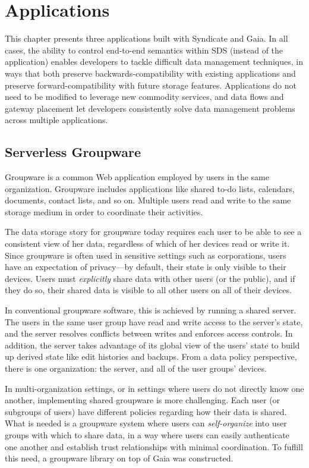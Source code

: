 \chapter{Applications}
\label{chap:applications}

This chapter presents three applications built with Syndicate and Gaia.
In all cases, the ability to control end-to-end semantics within SDS
(instead of the application) enables
developers to tackle difficult data management
techniques, in ways that both preserve backwards-compatibility with existing
applications and preserve forward-compatibility with future storage features.
Applications do not need to be modified to leverage
new commodity services, and data flows and gateway placement let developers
consistently solve data management problems across multiple applications.

\section{Serverless Groupware}

Groupware is a common Web application employed by users in the same
organization.  Groupware includes applications like shared to-do lists, calendars,
documents, contact lists, and so on.  Multiple users read and write to the same
storage medium in order to coordinate their activities.

The data storage story for groupware today requires each user to be able to see
a consistent view of her data, regardless of which of her devices read or write
it.  Since groupware is often used in sensitive
settings such as corporations, users have an expectation of privacy---by
default, their state is only visible to their devices.  Users must
\emph{explicitly} share data with other users (or the public), and if they do
so, their shared data is visible to all other users on all of their devices.

In conventional groupware software, this is achieved by running a shared server.
The users in the same user group have read and write access to the server's
state, and the server resolves conflicts between writes and enforces access
controls.  In addition, the server takes advantage of its global view of the
users' state to build up derived state like edit histories and
backups.  From a data policy perspective, there is
one organization:  the server, and all of the user groups'
devices.

In multi-organization settings, or in settings where users do not directly know
one another, implementing shared groupware is more challenging.  Each user (or
subgroups of users) have different policies regarding how their data is shared.
What is needed is a groupware system where users can \emph{self-organize} into
user groups with which to share data, in a way where users can easily
authenticate one another and establish trust relationships with minimal
coordination.  To fuflill this need, a groupware library on top of Gaia was
constructed.

